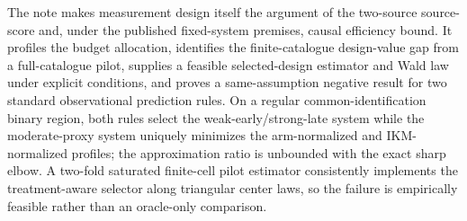 The note makes measurement design itself the argument of the two-source source-score and, under the published fixed-system premises, causal efficiency bound.  It profiles the budget allocation, identifies the finite-catalogue design-value gap from a full-catalogue pilot, supplies a feasible selected-design estimator and Wald law under explicit conditions, and proves a same-assumption negative result for two standard observational prediction rules.  On a regular common-identification binary region, both rules select the weak-early/strong-late system while the moderate-proxy system uniquely minimizes the arm-normalized and IKM-normalized profiles; the approximation ratio is unbounded with the exact sharp elbow.  A two-fold saturated finite-cell pilot estimator consistently implements the treatment-aware selector along triangular center laws, so the failure is empirically feasible rather than an oracle-only comparison.